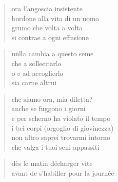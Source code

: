 	\begin{verse}
		ora l’angoscia insistente\\
		bordone alla vita di un uomo\\
		grumo che volta a volta\\
		si contrae a ogni effusione
	\end{verse}

	\begin{verse}
		nulla cambia a questo seme\\
		che a sollecitarlo\\
		o e ad accoglierlo\\
		sia carne altrui
	\end{verse}

\clearpage


\vspace*{2cm}

	\begin{verse}
		che siamo ora, mia diletta?\\
		anche se fuggono i giorni\\
		e per scherno ha violato il tempo\\
		i bei corpi (orgoglio di giovinezza)\\
		non altro saprei trovarmi intorno\\
		che valga i tuoi seni appassiti
	\end{verse}

\clearpage


\vspace*{2cm}

	\begin{otherlanguage}{french}
		\begin{verse}
			dès le matin décharger vite\\
			avant de s'habiller pour la journée
		\end{verse}
	\end{otherlanguage}
